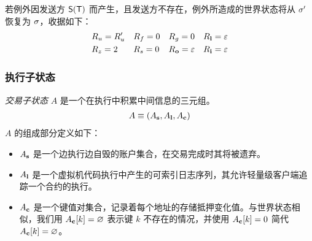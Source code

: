 若例外因发送方 $\mathsf{S}{\left({\textsf{T}} \right)}$ 而产生，且发送方不存在，例外所造成的世界状态将从 $\mathbf{\sigma}'$ 恢复为 $\mathbf{\sigma}$，收据如下：
\begin{align}
&R_u=R'_u && R_f=0 && R_g=0 && R_{\bf l}=\mathbb{\varepsilon} \\
&R_z=2 && R_s=0 && R_{\bf o}=\mathbb{\varepsilon} && R_{\bf i}=\mathbb{\varepsilon}
\end{align}


\subsubsection{执行子状态}
\label{subsubsec:substate}

\emph{交易子状态} $A$ 是一个在执行中积累中间信息的三元组。
\begin{align}
	A\equiv \left( A_{\bf s}, A_{\bf l}, A_{\bf c}\right)
\end{align}
$A$ 的组成部分定义如下：
\begin{itemize}[nosep]
	\item $A_{\bf s}$ 是一个边执行边自毁的账户集合，在交易完成时其将被遗弃。

	\item $A_{\bf l}$ 是一个虚拟机代码执行中产生的可索引日志序列，其允许轻量级客户端追踪一个合约的执行。

	\item $A_{\bf c}$ 是一个键值对集合，记录着每个地址的存储抵押变化值。与世界状态相似，我们用 $A_{\bf c}[k]=\varnothing$ 表示键 $k$ 不存在的情况，并使用 $A_{\bf c}[k]=0$ 简代 $A_{\bf c}[k]=\varnothing$。

\end{itemize}

